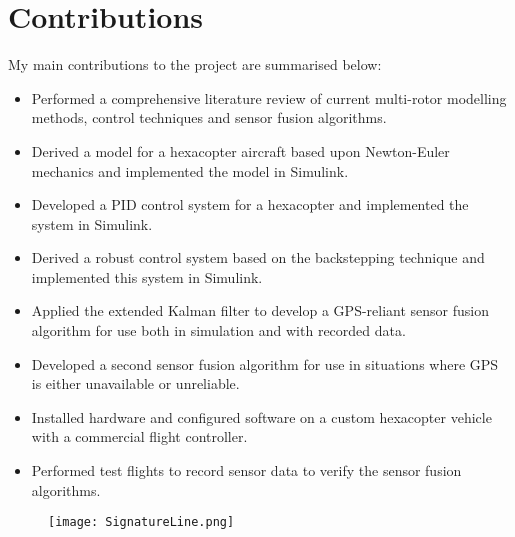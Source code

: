 
\chapter*{Contributions}\label{Contributions}
My main contributions to the project are summarised below:
\begin{itemize}
\item Performed a comprehensive literature review of current multi-rotor modelling methods, control techniques and sensor fusion algorithms.
\item Derived a model for a hexacopter aircraft based upon Newton-Euler mechanics and implemented the model in Simulink.
\item Developed a PID control system for a hexacopter and implemented the system in Simulink.
\item Derived a robust control system based on the backstepping technique and implemented this system in Simulink.
\item Applied the extended Kalman filter to develop a GPS-reliant sensor fusion algorithm for use both in simulation and with recorded data.
\item Developed a second sensor fusion algorithm for use in situations where GPS is either unavailable or unreliable.
\item Installed hardware and configured software on a custom hexacopter vehicle with a commercial flight controller.
\item Performed test flights to record sensor data to verify the sensor fusion algorithms.
\end{itemize}
\vspace{\baselineskip}

\begin{figure}[h!]
\begin{center}
	\texttt{[image: SignatureLine.png]}%
	\end{center}
\end{figure}
\clearpage


